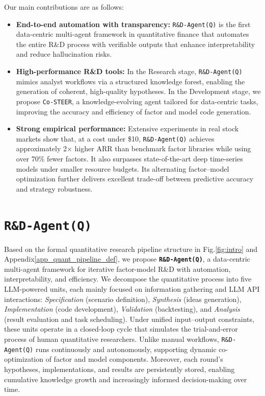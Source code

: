 \documentclass{article}
\newcommand{\name}{\texttt{R\&D-Agent(Q)}}
\begin{document}
\vspace{-0.12cm}
Our main contributions are as follows:

\vspace{-0.12cm}
\begin{itemize}[leftmargin=2ex]
    \item \textbf{End-to-end automation with transparency: }
    \texttt{\name} is the first data-centric multi-agent framework in quantitative finance that automates the entire R\&D process with verifiable outputs that enhance interpretability and reduce hallucination risks.  \vspace{-0.18cm}

    \item \textbf{High-performance R\&D tools:} In the Research stage, \texttt{\name} mimics analyst workflows via a structured knowledge forest, enabling the generation of coherent, high-quality hypotheses. In the Development stage, we propose \texttt{Co-STEER}, a knowledge-evolving agent tailored for data-centric tasks, improving the accuracy and efficiency of factor and model code generation.\vspace{-0.18cm}
    
    \item \textbf{Strong empirical performance:}
    Extensive experiments in real stock markets show that, at a cost under \$10, \texttt{\name} achieves approximately 2× higher ARR than benchmark factor libraries while using over 70\% fewer factors. It also surpasses state-of-the-art deep time-series models under smaller resource budgets. Its alternating factor–model optimization further delivers excellent trade-off between predictive accuracy and strategy robustness.
\end{itemize}


\newpage
\section{\name}
Based on the formal quantitative research pipeline structure in Fig.\ref{fig:intro} and Appendix\ref{app_quant_pipeline_def}, we propose \textbf{\texttt{\name}}, a data-centric multi-agent framework for iterative factor-model R\&D with automation, interpretability, and efficiency.
We decompose the quantitative process into five LLM-powered units, each mainly focused on information gathering and LLM API interactions: \textit{Specification} (scenario definition), \textit{Synthesis} (ideas generation), \textit{Implementation} (code development), \textit{Validation} (backtesting), and \textit{Analysis} (result evaluation and task scheduling).
Under unified input–output constraints, these units operate in a closed-loop cycle that simulates the trial-and-error process of human quantitative researchers.
Unlike manual workflows, \texttt{\name} runs continuously and autonomously, supporting dynamic co-optimization of factor and model components.
Moreover, each round’s hypotheses, implementations, and results are persistently stored, enabling cumulative knowledge growth and increasingly informed decision-making over time.
\end{document}
